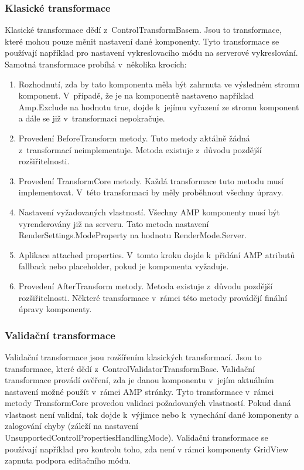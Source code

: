 \subsubsection{Klasické transformace}
    Klasické transformace dědí z~ControlTransformBasem. Jsou to transformace, které mohou pouze měnit nastavení dané komponenty. Tyto transformace se používají například pro nastavení vykreslovacího módu na serverové vykreslování. Samotná transformace probíhá v~několika krocích:
    \pagebreak
    \begin{enumerate}
        \item Rozhodnutí, zda by tato komponenta měla být zahrnuta ve výsledném stromu komponent.\newline
        V~případě, že je na komponentě nastaveno například Amp.Exclude na hodnotu true, dojde k~jejímu vyřazení ze stromu komponent a dále se již v~transformaci nepokračuje.
        \item Provedení BeforeTransform metody.\newline
        Tuto metody aktálně žádná z~transformací neimplementuje. Metoda existuje z~důvodu pozdější rozšiřitelnosti.
        \item Provedení TransformCore metody.\newline
        Každá transformace tuto metodu musí implementovat. V~této transformaci by měly proběhnout všechny úpravy. 
        \item Nastavení vyžadovaných vlastností.\newline
        Všechny AMP komponenty musí být vyrenderovány již na serveru. Tato metoda nastavení RenderSettings.ModeProperty na hodnotu RenderMode.Server.
        \item Aplikace attached properties.\newline
        V~tomto kroku dojde k~přidání AMP atributů fallback nebo placeholder, pokud je komponenta vyžaduje.
        \item Provedení AfterTransform metody.\newline
        Metoda existuje z~důvodu pozdější rozšiřitelnosti. Některé transformace v~rámci této metody provádějí finální úpravy komponenty.
    \end{enumerate}
\subsubsection{Validační transformace}
    Validační transformace jsou rozšířením klasických transformací. Jsou to transformace, které dědí z~ControlValidatorTransformBase. Validační transformace provádí ověření, zda je danou komponentu v~jejím aktuálním nastavení možné použít v~rámci AMP stránky. Tyto transformace v~rámci metody TransformCore provedou validaci požadovaných vlastností. Pokud daná vlastnost není validní, tak dojde k~výjimce nebo k~vynechání dané komponenty a zalogování chyby (záleží na nastavení UnsupportedControlPropertiesHandlingMode). Validační transformace se používají například pro kontrolu toho, zda není v rámci komponenty GridView zapnuta podpora editačního módu.

